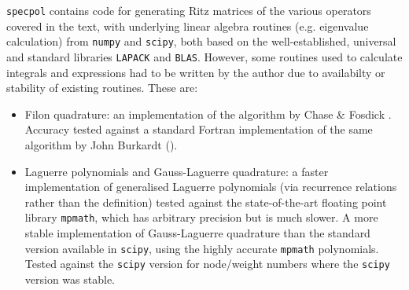 \documentclass{article}
\newcommand{\1}{\mathbf{1}} %
\begin{document}
\texttt{specpol} contains code for generating Ritz matrices of the various operators covered in the text,
with underlying linear algebra routines (e.g. eigenvalue calculation) from \texttt{numpy} and \texttt{scipy}, both based on the
well-established, universal and standard libraries \texttt{LAPACK} and \texttt{BLAS}. However, some routines used to calculate
integrals and expressions had to be written by the author due to availabilty or stability of existing routines. These are:

\begin{itemize}
  \item Filon quadrature: an implementation of the algorithm by Chase \& Fosdick
    \cite{chase1969algorithm}. Accuracy tested against a standard Fortran implementation
    of the same algorithm by John Burkardt (\cite{burkardt2014filon}).
  \item Laguerre polynomials and Gauss-Laguerre quadrature: a faster implementation
    of generalised Laguerre polynomials (via recurrence relations rather than the definition)
    tested against the state-of-the-art floating point library \texttt{mpmath}, which has
    arbitrary precision but is much slower.
    A more stable implementation of Gauss-Laguerre quadrature
    than the standard version available in \texttt{scipy}, 
    using the highly accurate \texttt{mpmath} polynomials. Tested against the \texttt{scipy}
    version for node/weight numbers where the \texttt{scipy} version was stable.
\end{itemize}

\clearpage
\printbibliography[heading=bibintoc]
\clearpage
\printindex
\clearpage
{}
\listoftheorems[ignoreall,show={definition,lemma,theorem,proposition,corollary},
title={List of Definitions and Theorems},
swapnumber]
\end{document}
